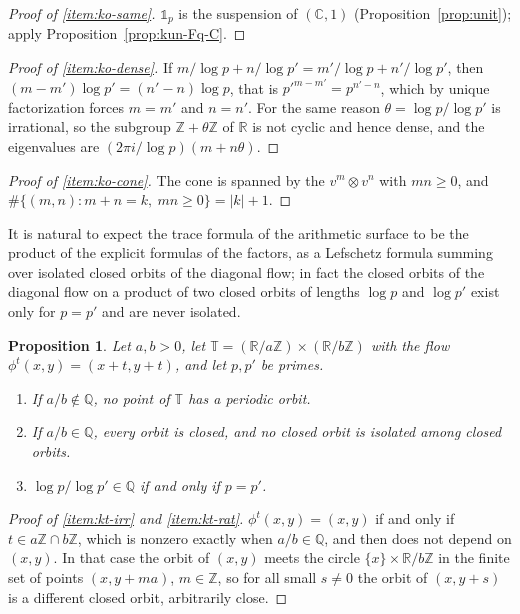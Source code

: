 \documentclass[11pt]{amsart}
\theoremstyle{plain}
\newtheorem{proposition}[theorem]{Proposition}
\theoremstyle{definition}
\theoremstyle{remark}
\numberwithin{equation}{section}
\newcommand{\C}{\mathbb{C}}
\newcommand{\R}{\mathbb{R}}
\newcommand{\Q}{\mathbb{Q}}
\newcommand{\Z}{\mathbb{Z}}
\begin{document}
\begin{proof}[Proof of \ref{item:ko-same}]
$\mathbb 1_p$ is the suspension of $(\C,1)$ (Proposition~\ref{prop:unit});
apply Proposition~\ref{prop:kun-Fq-C}.
\end{proof}

\begin{proof}[Proof of \ref{item:ko-dense}]
If $m/\log p+n/\log p'=m'/\log p+n'/\log p'$, then
$(m-m')\log p'=(n'-n)\log p$, that is $p'^{m-m'}=p^{n'-n}$, which by
unique factorization forces $m=m'$ and $n=n'$. For the same reason
$\theta=\log p/\log p'$ is irrational, so the subgroup $\Z+\theta\Z$ of
$\R$ is not cyclic and hence dense, and the eigenvalues are
$(2\pi i/\log p)(m+n\theta)$.
\end{proof}

\begin{proof}[Proof of \ref{item:ko-cone}]
The cone is spanned by the $v^m\otimes v^n$ with $mn\ge0$, and
$\#\{(m,n):m+n=k,\ mn\ge0\}=|k|+1$.
\end{proof}

It is natural to expect the trace formula of the arithmetic surface to
be the product of the explicit formulas of the factors, as a Lefschetz
formula summing over isolated closed orbits of the diagonal flow; in
fact the closed orbits of the diagonal flow on a product of two closed
orbits of lengths $\log p$ and $\log p'$ exist only for $p=p'$ and are
never isolated.

\begin{proposition}\label{prop:kun-torus}
Let $a,b>0$, let $\mathbb T=(\R/a\Z)\times(\R/b\Z)$ with the flow
$\phi^t(x,y)=(x+t,y+t)$, and let $p,p'$ be primes.
\begin{enumerate}[label=(\roman*)]
\item\label{item:kt-irr} If $a/b\notin\Q$, no point of $\mathbb T$ has
  a periodic orbit.
\item\label{item:kt-rat} If $a/b\in\Q$, every orbit is closed, and no
  closed orbit is isolated among closed orbits.
\item\label{item:kt-primes} $\log p/\log p'\in\Q$ if and only if
  $p=p'$.
\end{enumerate}
\end{proposition}

\begin{proof}[Proof of \ref{item:kt-irr} and \ref{item:kt-rat}]
$\phi^t(x,y)=(x,y)$ if and only if $t\in a\Z\cap b\Z$, which is nonzero
exactly when $a/b\in\Q$, and then does not depend on $(x,y)$. In that
case the orbit of $(x,y)$ meets the circle $\{x\}\times\R/b\Z$ in the
finite set of points $(x,y+ma)$, $m\in\Z$, so for all small $s\ne0$ the
orbit of $(x,y+s)$ is a different closed orbit, arbitrarily close.
\end{proof}
\end{document}
